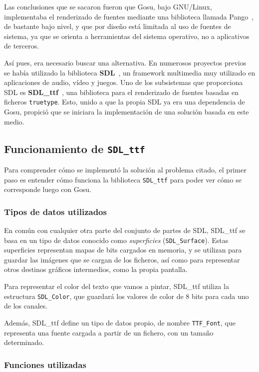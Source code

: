 Las conclusiones que se sacaron fueron que Gosu, bajo GNU/Linux, implementaba el
renderizado de fuentes mediante una biblioteca llamada Pango~\cite{Pango}, de
bastante bajo nivel, y que por diseño está limitada al uso de fuentes de
sistema, ya que se orienta a herramientas del sistema operativo, no a
aplicativos de terceros.

Así pues, era necesario buscar una alternativa. En numerosos proyectos
previos~\cite{robinson} se había utilizado la biblioteca
\textbf{SDL}~\cite{refsdl}, un framework multimedia muy utilizado en
aplicaciones de audio, vídeo y juegos. Uno de los subsistemas que proporciona
SDL es \textbf{SDL\_ttf}~\cite{refsdlttf}, una biblioteca para el renderizado de
fuentes basadas en ficheros \texttt{truetype}. Esto, unido a que la propia SDL
ya era una dependencia de Gosu, propició que se iniciara la implementación de
una solución basada en este medio.

\subsection{Funcionamiento de \texttt{SDL\_ttf}}

Para comprender cómo se implementó la solución al problema citado, el primer
paso es entender cómo funciona la biblioteca \texttt{SDL\_ttf} para poder ver
cómo se corresponde luego con Gosu.

\subsubsection{Tipos de datos utilizados}

En común con cualquier otra parte del conjunto de partes de SDL, SDL\_ttf se basa
en un tipo de datos conocido como \textit{superficies}
(\texttt{SDL\_Surface}). Estas superficies representan mapas de bits cargados en
memoria, y se utilizan para guardar las imágenes que se cargan de los ficheros,
así como para representar otros destinos gráficos intermedios, como la propia
pantalla.

Para representar el color del texto que vamos a pintar, SDL\_ttf utiliza la
estructura \texttt{SDL\_Color}, que guardará los valores de color de 8 bits para
cada uno de los canales.

Además, SDL\_ttf define un tipo de datos propio, de nombre \texttt{TTF\_Font}, que
representa una fuente cargada a partir de un fichero, con un tamaño determinado.

\subsubsection{Funciones utilizadas}

